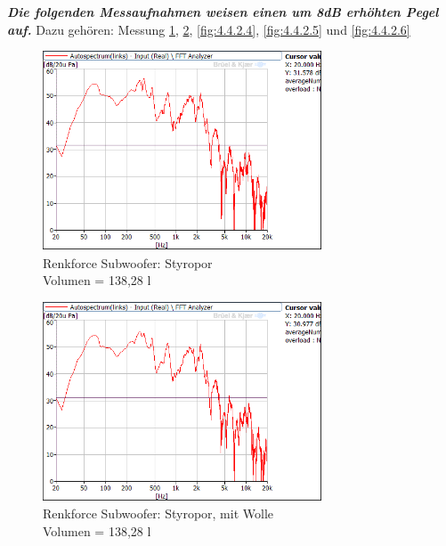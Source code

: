 \newpage
\textit{\textbf{ Die folgenden Messaufnahmen weisen einen um 8dB erhöhten Pegel auf.}} Dazu gehören: Messung \ref{fig:4.4.2.2}, \ref{fig:4.4.2.3}, \ref{fig:4.4.2.4}, \ref{fig:4.4.2.5} und \ref{fig:4.4.2.6}\\

\begin{figure} [H]
\centering
\includegraphics[width=0.74\textwidth]{img/Optimierung/Sub/RenkforceStyro_138l.png}
\caption{Renkforce Subwoofer: Styropor \\Volumen = 138,28 l}
\label{fig:4.4.2.2}
\end{figure}

\begin{figure} [H]
\centering
\includegraphics[width=0.74\textwidth]{img/Optimierung/Sub/RenkforceStyro_138l_Wolle.png}
\caption{Renkforce Subwoofer: Styropor, mit Wolle \\Volumen = 138,28 l}
\label{fig:4.4.2.3}
\end{figure}

